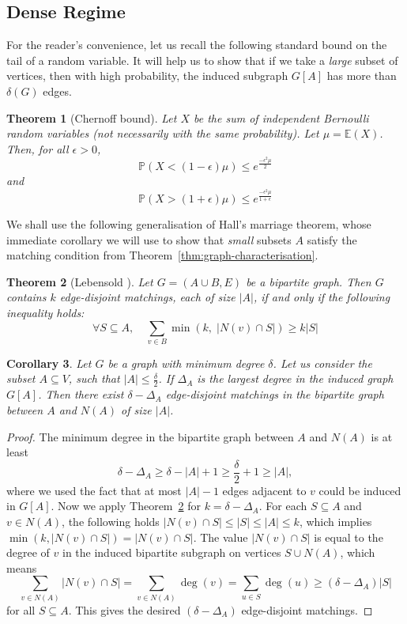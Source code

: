 \documentclass[12pt,UKenglish]{amsart}
\newtheorem{thm}{Theorem}[section]
\theoremstyle{plain}
\newtheorem{cor}[thm]{Corollary}
\theoremstyle{definition}
\theoremstyle{remark}
\begin{document}
\subsection{Dense Regime}
For the reader's convenience, let us recall the following standard bound on the tail of a random variable.
 It will help us to show that if we take a \textit{large} subset of vertices, then with high probability, the induced subgraph $G[A]$ has more than $\delta(G)$ edges.
 \begin{thm}[Chernoff bound]
  Let $X$ be the sum of independent Bernoulli random variables (not necessarily with the same
probability).
 Let $\mu=\mathbb{E}(X)$. Then, for all $\epsilon>0$,
\[\mathbb{P}(X<(1-\epsilon)\mu)\le e^{\frac{-\epsilon^2\mu}{2}}\]
and
\[\mathbb{P}(X>(1+\epsilon)\mu)\le e^{\frac{-\epsilon^2\mu}{1+\epsilon}}\]
\end{thm}
We shall use the following generalisation of Hall's marriage theorem, whose immediate corollary we will use to show that \textit{small} subsets $A$ satisfy the matching condition from Theorem~\ref{thm:graph-characterisation}.
 \begin{thm}[Lebensold \cite{Lebensold1977}]\label{thm:lebensold}
Let \( G = (A \cup B, E) \) be a bipartite graph.
 Then \( G \) contains \( k \) edge-disjoint matchings, each of size $|A|$, if and only if the following inequality holds:
\[\forall S \subseteq A,\quad \sum_{v \in B} \min\left(k,\; |N(v) \cap S| \right) \geq k |S|\]
\end{thm}
\begin{cor}\label{cor:lebensold}
  Let $G$ be a graph with minimum degree $\delta$.
 Let us consider the subset $A\subseteq V$, such that $|A|\le\frac{\delta}{2}$.
 If $\Delta_A$ is the largest degree in the induced graph $G[A]$.
 Then there exist $\delta-\Delta_A$ edge-disjoint matchings in the bipartite graph between $A$ and $N(A)$ of size $|A|$.
 \end{cor}
\begin{proof}
  The minimum degree in the bipartite graph between $A$ and $N(A)$ is at least \[\delta-\Delta_A\ge\delta-|A|+1\ge\frac{\delta}{2}+1\ge|A|,\]
 where we used the fact that at most $|A|-1$ edges adjacent to $v$ could be induced in $G[A]$.
 Now we apply Theorem~\ref{thm:lebensold} for $k=\delta-\Delta_A$. For each $S\subseteq A$ and $v\in N(A)$, the following holds $|N(v) \cap S|\le|S|\le|A|\le k$, which implies $\min(k,|N(v) \cap S|)=|N(v) \cap S|$.
 The value $|N(v) \cap S|$ is equal to the degree of $v$ in the induced bipartite subgraph on vertices $S\cup N(A)$, which means
 \[\sum_{v\in N(A)}|N(v) \cap S|=\sum_{v\in N(A)}\deg(v)=\sum_{u\in S}\deg(u)\ge(\delta-\Delta_A)|S|\]
for all $S\subseteq A$. This gives the desired $(\delta-\Delta_A)$ edge-disjoint matchings.
 \end{proof}
\end{document}
